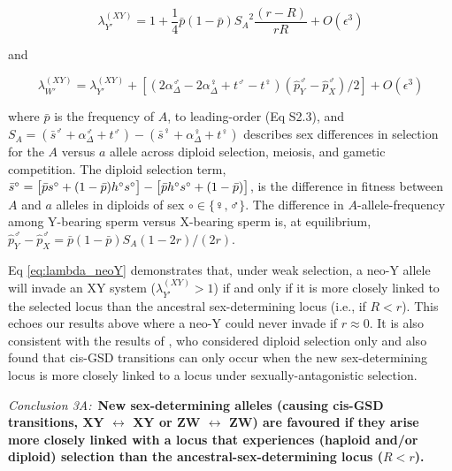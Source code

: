 \documentclass[10pt,letterpaper]{article}
\begin{document}
\begin{equation}
\lambda_{Y'}^{(XY)} = 1 + \frac{1}{4}\bar{p}(1-\bar{p}){S_{A}}^2\frac{ \left( r-R \right) }{r R}+O\left(\epsilon^3 \right) 
\label{eq:lambda_neoY}
\end{equation}

\noindent 
and 

\begin{equation}
\lambda_{W'}^{(XY)} =\lambda_{Y'}^{(XY)}+\left[\left(2\alpha_{\Delta}^\male-2\alpha_{\Delta}^\female+t^\male-t^\female \right) \left( \hat{p}^\male_Y-\hat{p}^\male_X \right)/2\right]
+O\left(\epsilon^3 \right)
\label{eq:lambda_neoW}
\end{equation}

\noindent
where $\bar{p}$ is the frequency of $A$, to leading-order (Eq S2.3), and $S_{A}=(\bar{s}^\male +\alpha_{\Delta}^\male+t^\male) - (\bar{s}^\female+\alpha_{\Delta}^\female+t^\female)$ describes sex differences in selection for the $A$ versus $a$ allele across diploid selection, meiosis, and gametic competition.
The diploid selection term, $\bar{s}^\circ=\big{[} \bar{p}s^\circ+(1-\bar{p})h^\circ s^\circ\big{]} -\big{[} \bar{p}h^\circ s^\circ+(1-\bar{p}) \big{]}$, is the difference in fitness between $A$ and $a$ alleles in diploids of sex $\circ \in \{\female,\male\}$. 
The difference in $A$-allele-frequency among Y-bearing sperm versus X-bearing sperm is, at equilibrium, $\hat{p}^\male_Y-\hat{p}^\male_X=\bar{p}(1-\bar{p})S_{A}(1-2r)/(2r)$. 

Eq \eqref{eq:lambda_neoY} demonstrates that, under weak selection, a neo-Y allele will invade an XY system ($\lambda_{Y'}^{(XY)}>1$) if and only if it is more closely linked to the selected locus than the ancestral sex-determining locus (i.e., if $R<r$). 
This echoes our results above where a neo-Y could never invade if $r\approx0$. 
It is also consistent with the results of \cite{vanDoorn:2007eu}, who considered diploid selection only and also found that cis-GSD transitions can only occur when the new sex-determining locus is more closely linked to a locus under sexually-antagonistic selection. 

\vspace{0.5cm}
\noindent\textit{Conclusion 3A:}\
\textbf{New sex-determining alleles (causing cis-GSD transitions, XY $\leftrightarrow$ XY or ZW $\leftrightarrow$ ZW) are favoured if they arise more closely linked with a locus that experiences (haploid and/or diploid) selection than the ancestral-sex-determining locus ($R<r$).}
\vspace{0.5cm}
\end{document}

